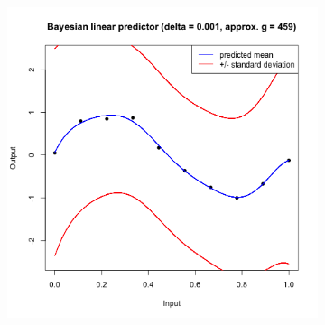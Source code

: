\documentclass[a4paper, 11pt]{article}
\begin{document}
\begin{figure}[H]
\begin{subfigure}{.5\textwidth}
  \includegraphics[width=1\linewidth]{ps3F_plot3_2.png}
\end{subfigure}
\end{figure}
\end{document}
